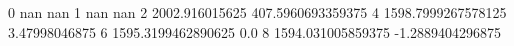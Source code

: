 0 nan nan
1 nan nan
2 2002.916015625 407.5960693359375
4 1598.7999267578125 3.47998046875
6 1595.3199462890625 0.0
8 1594.031005859375 -1.2889404296875
